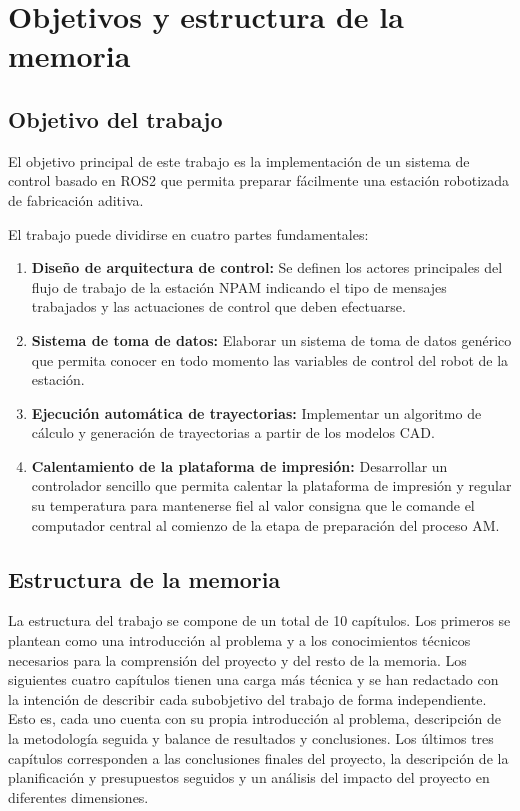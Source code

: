 \chapter{Objetivos y estructura de la memoria} \label{cap: objetivos}
\section{Objetivo del trabajo}
El objetivo principal de este trabajo es la implementación de un sistema de control basado en ROS2 que permita preparar fácilmente una estación robotizada de fabricación aditiva.

El trabajo puede dividirse en cuatro partes fundamentales:
\begin{enumerate}
    \item \textbf{Diseño de arquitectura de control:} Se definen los actores principales del flujo de trabajo de la estación \acrshort{NPAM} indicando el tipo de mensajes trabajados y las actuaciones de control que deben efectuarse.
    \item \textbf{Sistema de toma de datos:} Elaborar un sistema de toma de datos genérico que permita conocer en todo momento las variables de control del robot de la estación.
    \item \textbf{Ejecución automática de trayectorias:} Implementar un algoritmo de cálculo y generación de trayectorias a partir de los modelos \acrshort{CAD}.
    \item \textbf{Calentamiento de la plataforma de impresión:} Desarrollar un controlador sencillo que permita calentar la plataforma de impresión y regular su temperatura para mantenerse fiel al valor consigna que le comande el computador central al comienzo de la etapa de preparación del proceso \acrshort{AM}.
\end{enumerate}

\section{Estructura de la memoria}
La estructura del trabajo se compone de un total de 10 capítulos. Los primeros se plantean como una introducción al problema y a los conocimientos técnicos necesarios para la comprensión del proyecto y del resto de la memoria. Los siguientes cuatro capítulos tienen una carga más técnica y se han redactado con la intención de describir cada subobjetivo del trabajo de forma independiente. Esto es, cada uno cuenta con su propia introducción al problema, descripción de la metodología seguida y balance de resultados y conclusiones. Los últimos tres capítulos corresponden a las conclusiones finales del proyecto, la descripción de la planificación y presupuestos seguidos y un análisis del impacto del proyecto en diferentes dimensiones.

